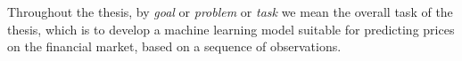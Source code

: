 
Throughout the thesis, by \emph{goal} or \emph{problem} or \emph{task} we mean the overall task of the thesis, which is to develop a machine learning model suitable for predicting prices on the financial market, based on a sequence of observations.


